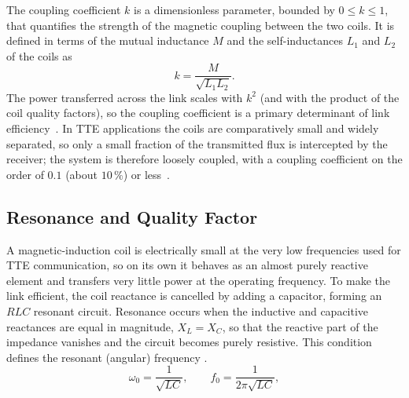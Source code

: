 The coupling coefficient $k$ is a dimensionless parameter, bounded by
$0 \le k \le 1$, that quantifies the strength of the magnetic coupling between the
two coils. It is defined in terms of the mutual inductance $M$ and the
self-inductances $L_1$ and $L_2$ of the coils as
\begin{equation}
    k = \frac{M}{\sqrt{L_1 L_2}}.
    \label{eq:coupling_coefficient}
\end{equation}
The power transferred across the link scales with $k^2$ (and with the product of
the coil quality factors), so the coupling coefficient is a primary determinant of
link efficiency~\cite{agbinya2022principles}. In TTE applications the coils are
comparatively small and widely separated, so only a small fraction of the
transmitted flux is intercepted by the receiver; the system is therefore loosely
coupled, with a coupling coefficient on the order of $0.1$ (about $10\,\%$) or
less~\cite{agbinya2022principles}.

\subsection{Resonance and Quality Factor}
\label{sec:resonance_q}

A magnetic-induction coil is electrically small at the very low frequencies used
for TTE communication, so on its own it behaves as an almost purely reactive
element and transfers very little power at the operating frequency. To make the
link efficient, the coil reactance is cancelled by adding a capacitor, forming an
$RLC$ resonant circuit. Resonance occurs when the inductive and capacitive
reactances are equal in magnitude, $X_L = X_C$, so that the reactive part of the
impedance vanishes and the circuit becomes purely resistive. This condition
defines the resonant (angular) frequency \cite{agbinya2022principles}.
\begin{equation}
    \omega_0 = \frac{1}{\sqrt{LC}}, \qquad
    f_0 = \frac{1}{2\pi\sqrt{LC}},
    \label{eq:resonant_frequency}
\end{equation}

